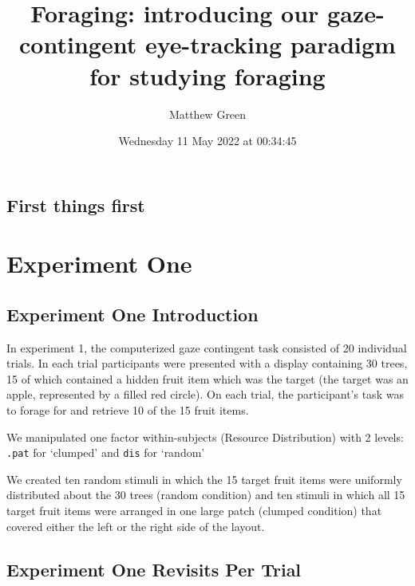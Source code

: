 \documentclass[
]{book}
\title{Foraging: introducing our gaze-contingent eye-tracking paradigm for studying foraging}
\author{Matthew Green}
\date{Wednesday 11 May 2022 at 00:34:45}
\theoremstyle{definition}
\theoremstyle{definition}
\theoremstyle{definition}
\theoremstyle{definition}
\theoremstyle{remark}
\begin{document}
\maketitle

{
\setcounter{tocdepth}{1}
\tableofcontents
}
\hypertarget{first-things-first}{%
\chapter{First things first}\label{first-things-first}}

\hypertarget{part-experiment-one}{%
\part{Experiment One}\label{part-experiment-one}}

\hypertarget{experiment-one-introduction}{%
\chapter{Experiment One Introduction}\label{experiment-one-introduction}}

In experiment 1, the computerized gaze contingent task consisted of
20 individual trials. In each trial participants were presented with a display
containing 30 trees, 15 of which contained a hidden fruit
item which was the target (the target was an apple, represented by a
filled red circle). On each trial, the participant's task was to forage for
and retrieve 10 of the 15 fruit items.

We manipulated one factor within-subjects (Resource Distribution) with 2 levels: \texttt{.pat} for `clumped' and \texttt{dis} for `random'

We created ten random stimuli in which
the 15 target fruit items were uniformly distributed about the 30 trees
(random condition) and ten stimuli in which all 15 target fruit items
were arranged in one large patch (clumped condition) that covered either
the left or the right side of the layout.

\hypertarget{experiment-one-revisits-per-trial}{%
\chapter{Experiment One Revisits Per Trial}\label{experiment-one-revisits-per-trial}}
\end{document}
